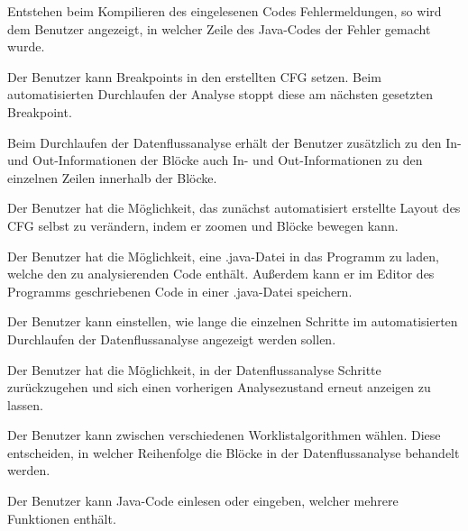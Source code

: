 Entstehen beim Kompilieren des eingelesenen Codes Fehlermeldungen, so wird dem Benutzer angezeigt, in welcher Zeile des Java-Codes der Fehler gemacht wurde.

Der Benutzer kann Breakpoints in den erstellten CFG setzen. Beim automatisierten Durchlaufen der Analyse stoppt diese am nächsten gesetzten Breakpoint.

Beim Durchlaufen der Datenflussanalyse erhält der Benutzer zusätzlich zu den In- und Out-Informationen der Blöcke auch In- und Out-Informationen zu den einzelnen Zeilen innerhalb der Blöcke.

Der Benutzer hat die Möglichkeit, das zunächst automatisiert erstellte Layout des CFG selbst zu verändern, indem er zoomen und Blöcke bewegen kann.

Der Benutzer hat die Möglichkeit, eine .java-Datei in das Programm zu laden, welche
den zu analysierenden Code enthält. Außerdem kann er im Editor des Programms geschriebenen Code in einer .java-Datei speichern.

\newpage

Der Benutzer kann einstellen, wie lange die einzelnen Schritte im automatisierten
Durchlaufen der Datenflussanalyse angezeigt werden sollen.

Der Benutzer hat die Möglichkeit, in der Datenflussanalyse Schritte zurückzugehen und sich einen vorherigen Analysezustand erneut anzeigen zu lassen.

Der Benutzer kann zwischen verschiedenen Worklistalgorithmen wählen. Diese
entscheiden, in welcher Reihenfolge die Blöcke in der Datenflussanalyse behandelt
werden.

Der Benutzer kann Java-Code einlesen oder eingeben, welcher mehrere Funktionen
enthält.

